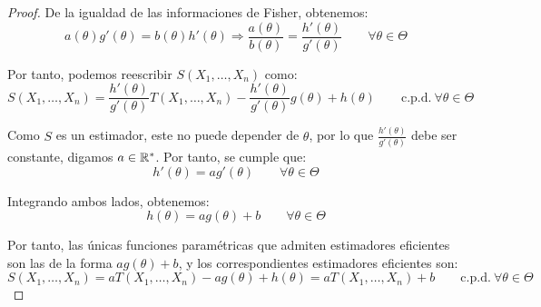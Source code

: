 \begin{coro}
\begin{proof}
        De la igualdad de las informaciones de Fisher, obtenemos:
        \begin{equation*}
            a(\theta)g'(\theta) = b(\theta)h'(\theta)\Longrightarrow
            \frac{a(\theta)}{b(\theta)} = \frac{h'(\theta)}{g'(\theta)}\qquad \forall \theta \in \Theta
        \end{equation*}

        Por tanto, podemos reescribir $S(X_1, \ldots, X_n)$ como:
        \begin{equation*}
            S(X_1, \ldots, X_n) = \frac{h'(\theta)}{g'(\theta)} T(X_1, \ldots, X_n) - \frac{h'(\theta)}{g'(\theta)} g(\theta) + h(\theta)\qquad \text{c.p.d.} \ \forall \theta \in \Theta
        \end{equation*}

        Como $S$ es un estimador, este no puede depender de $\theta$, por lo que $\frac{h'(\theta)}{g'(\theta)}$ debe ser constante, digamos $a\in \mathbb{R}^*$. Por tanto, se cumple que:
        \begin{equation*}
            h'(\theta) = a g'(\theta)\qquad \forall \theta \in \Theta
        \end{equation*}

        Integrando ambos lados, obtenemos:
        \begin{equation*}
            h(\theta) = a g(\theta) + b\qquad \forall \theta \in \Theta
        \end{equation*}

        Por tanto, las únicas funciones paramétricas que admiten estimadores eficientes son las de la forma $ag(\theta) + b$, y los correspondientes estimadores eficientes son:
        \begin{equation*}
            S(X_1, \ldots, X_n) = a T(X_1, \ldots, X_n) - a g(\theta) + h(\theta) = a T(X_1, \ldots, X_n) + b\qquad \text{c.p.d.} \ \forall \theta \in \Theta
        \end{equation*}
    \end{proof}
\end{coro}

